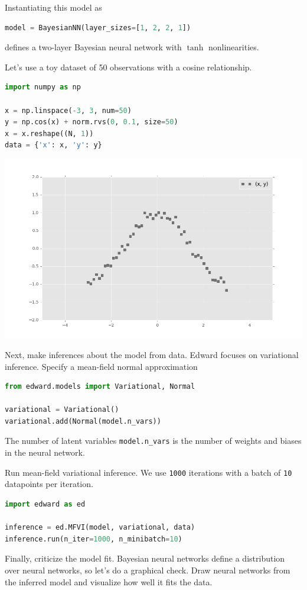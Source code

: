 Instantiating this model as
\begin{lstlisting}[language=Python]
model = BayesianNN(layer_sizes=[1, 2, 2, 1])
\end{lstlisting}
defines a two-layer Bayesian neural network with $\tanh$
nonlinearities.

Let's use a toy dataset of 50 observations with a cosine relationship.
\begin{lstlisting}[language=Python]
import numpy as np

x = np.linspace(-3, 3, num=50)
y = np.cos(x) + norm.rvs(0, 0.1, size=50)
x = x.reshape((N, 1))
data = {'x': x, 'y': y}
\end{lstlisting}
\includegraphics[width=700px]{images/getting-started-fig0.png}

Next, make inferences about the model from data.
Edward focuses on variational inference. Specify a mean-field normal
approximation
\begin{lstlisting}[language=Python]
from edward.models import Variational, Normal

variational = Variational()
variational.add(Normal(model.n_vars))
\end{lstlisting}
The number of latent variables \texttt{model.n_vars} is the number
of weights and biases in the neural network.

Run mean-field variational inference. We use \texttt{1000} iterations
with a batch of \texttt{10} datapoints per iteration.
\begin{lstlisting}[language=Python]
import edward as ed

inference = ed.MFVI(model, variational, data)
inference.run(n_iter=1000, n_minibatch=10)
\end{lstlisting}

Finally, criticize the model fit. Bayesian neural networks define a
distribution over neural networks, so let's do a graphical check. Draw
neural networks from the inferred model and visualize how well it
fits the data.

